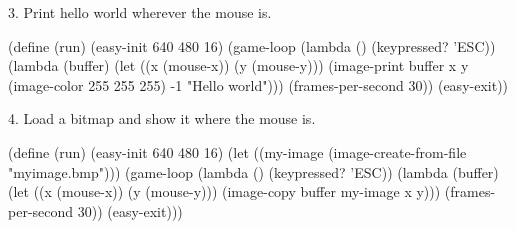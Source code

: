 3. Print hello world wherever the mouse is.

\begin{schemedisplay}
(define (run)
  (easy-init 640 480 16)
  (game-loop
     (lambda ()
        (keypressed? 'ESC))
     (lambda (buffer)
        (let ((x (mouse-x))
	      (y (mouse-y)))
	 (image-print buffer x y (image-color 255 255 255) -1 "Hello world")))
     (frames-per-second 30))
  (easy-exit))
\end{schemedisplay}

4. Load a bitmap and show it where the mouse is.

\begin{schemedisplay}
(define (run)
  (easy-init 640 480 16)
  (let ((my-image (image-create-from-file "myimage.bmp")))
    (game-loop
      (lambda ()
        (keypressed? 'ESC))
      (lambda (buffer)
        (let ((x (mouse-x))
	      (y (mouse-y)))
	 (image-copy buffer my-image x y)))
     (frames-per-second 30))
  (easy-exit)))
\end{schemedisplay}


